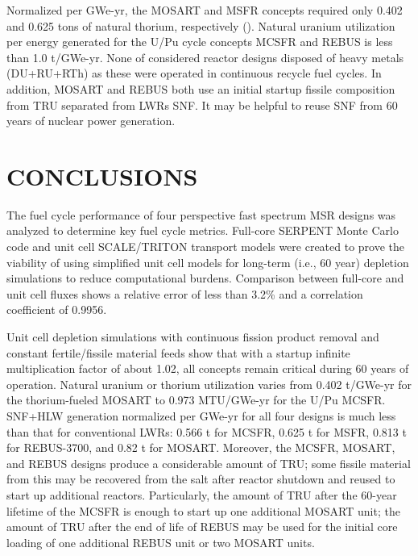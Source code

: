 \documentclass{anstrans}
\begin{document}
Normalized per GWe-yr, the \gls{MOSART} and \gls{MSFR} concepts required only 0.402 and 0.625 tons of natural thorium, respectively (). Natural uranium utilization per energy generated for the U/Pu cycle concepts \gls{MCSFR} and REBUS is less than 1.0 t/GWe-yr. None of considered reactor designs disposed of heavy metals (\gls{DU}+\gls{RU}+\gls{RTh}) as these were operated in continuous recycle fuel cycles.
In addition, \gls{MOSART} and REBUS both use an initial startup fissile composition from \gls{TRU} separated from \glspl{LWR} \gls{SNF}. It may be helpful to reuse \gls{SNF} from 60 years of nuclear power generation. 
\section{CONCLUSIONS}
The fuel cycle performance of four perspective fast spectrum \gls{MSR} designs was analyzed to determine key fuel cycle metrics. Full-core SERPENT Monte Carlo code and unit cell SCALE/TRITON transport models were created to prove the viability of using simplified unit cell models for long-term (i.e., 60 year) depletion simulations to reduce computational burdens. Comparison between full-core and unit cell fluxes shows a relative error of less than 3.2\% and a correlation coefficient of 0.9956.

Unit cell depletion simulations with continuous fission product removal and constant fertile/fissile material feeds show that with a startup infinite multiplication factor of about 1.02, all concepts remain critical during 60 years of operation. Natural uranium or thorium utilization varies from 0.402 t/GWe-yr for the thorium-fueled \gls{MOSART} to 0.973 MTU/GWe-yr for the U/Pu \gls{MCSFR}. \gls{SNF}+\gls{HLW} generation normalized per GWe-yr for all four designs is much less than that for conventional \glspl{LWR}: 0.566 t for \gls{MCSFR}, 0.625 t for \gls{MSFR}, 0.813 t for REBUS-3700, and 0.82 t for \gls{MOSART}. Moreover, the \gls{MCSFR}, \gls{MOSART}, and REBUS designs produce a considerable amount of \gls{TRU}; some fissile material from this may be recovered from the salt after reactor shutdown and reused to start up additional reactors. Particularly, the amount of \gls{TRU} after the 60-year lifetime of the \gls{MCSFR} is enough to start up one additional \gls{MOSART} unit; the amount of \gls{TRU} after the end of life of REBUS may be used for the initial core loading of one additional REBUS unit or two \gls{MOSART} units. 
\end{document}
